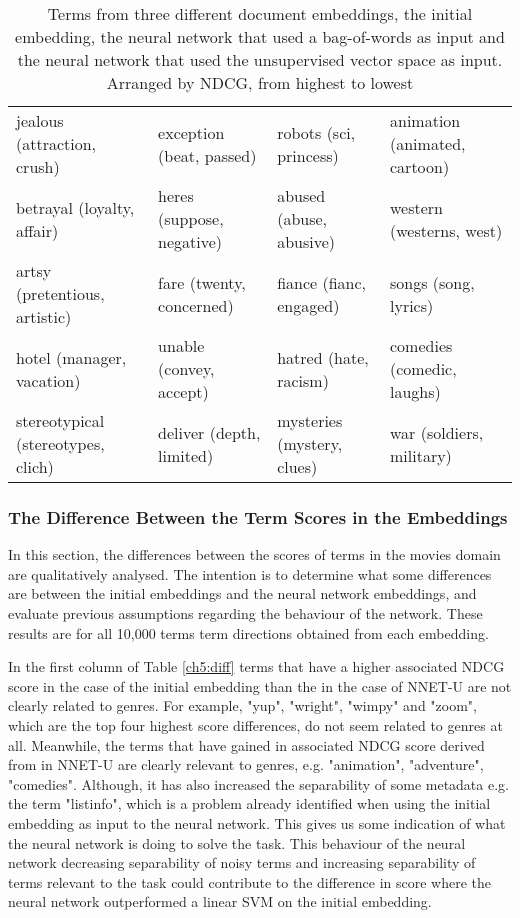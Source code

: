 \begin{table}[]
\begin{tabular}{L{3.8cm}L{3.8cm}L{3.8cm}L{3.8cm}}
jealous (attraction, crush)          & exception (beat, passed)                    & robots (sci, princess)                 & animation (animated, cartoon)              \\
betrayal (loyalty, affair)           & heres (suppose, negative)                   & abused (abuse, abusive)                & western (westerns, west)                   \\
artsy (pretentious, artistic)        & fare (twenty, concerned)                    & fiance (fianc, engaged)                & songs (song, lyrics)                       \\
hotel (manager, vacation)            & unable (convey, accept)                     & hatred (hate, racism)                  & comedies (comedic, laughs)                 \\
stereotypical (stereotypes, clich)   & deliver (depth, limited)                    & mysteries (mystery, clues)             & war (soldiers, military)                   \\                                   
	\end{tabular}\caption{Terms from three different document embeddings, the initial embedding, the neural network that used a bag-of-words as input and the neural network that used the unsupervised vector space as input. Arranged by NDCG, from highest to lowest}
\end{table}


\subsubsection{The Difference Between the Term Scores in the Embeddings}\label{ch5:diffsection}

In this section, the differences between the scores of terms in the movies domain are qualitatively analysed. The intention is to determine what some differences are between the initial embeddings and the neural network embeddings, and evaluate previous assumptions regarding the behaviour of the network. These results are for all 10,000 terms term directions obtained from each embedding. 

In the first column of  Table \ref{ch5:diff} terms that have a higher associated NDCG score in the case of the initial embedding than the in the case of NNET-U are not clearly related to genres. For example, "yup", "wright", "wimpy" and "zoom", which are the top four highest score differences, do not seem related to genres at all. Meanwhile, the terms that have gained in associated NDCG score derived from in NNET-U are clearly relevant to genres, e.g. "animation", "adventure", "comedies". Although, it has also increased the separability of some metadata e.g. the term "listinfo", which is a problem already identified when using the initial embedding as input to the neural network. This gives us some indication of what the neural network is doing to solve the task. This behaviour of the neural network decreasing separability of noisy terms and increasing separability of terms relevant to the task could contribute to the difference in score where the neural network outperformed a linear SVM on the initial embedding. 

